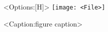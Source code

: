\begin{figure}<Options:[H]>
\centering
	\texttt{[image: <File>]}
	\caption{<Caption:figure caption>}
	\label{<Label>}
\end{figure}

